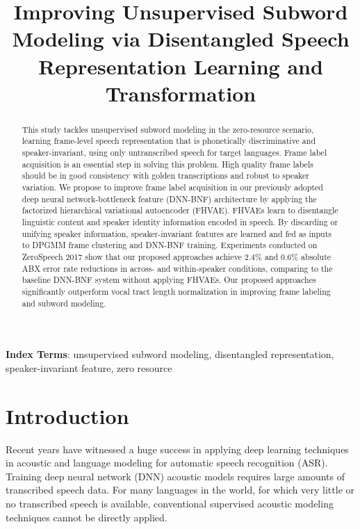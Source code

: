 \documentclass[a4paper]{article}
\title{Improving Unsupervised Subword Modeling via Disentangled Speech Representation Learning and Transformation}
\begin{document}
\maketitle
% 
\begin{abstract}
This study tackles unsupervised subword modeling in the zero-resource scenario, learning frame-level speech representation that is phonetically discriminative and speaker-invariant, using only untranscribed speech for target languages. Frame label acquisition is an essential step in solving this problem. High quality frame labels  should be in good consistency with golden transcriptions and robust to speaker variation. We propose to improve frame label acquisition in our previously adopted deep neural network-bottleneck feature (DNN-BNF) architecture by applying the factorized hierarchical variational autoencoder (FHVAE). FHVAEs learn to disentangle linguistic content and speaker identity information encoded in speech. By discarding or unifying speaker information, speaker-invariant features are learned and fed as inputs to DPGMM frame clustering and DNN-BNF training. Experiments conducted on ZeroSpeech 2017 show that our proposed approaches achieve $2.4\%$ and $0.6\%$ absolute ABX error rate reductions in across- and within-speaker conditions, comparing to the baseline DNN-BNF system without applying FHVAEs. Our proposed approaches significantly outperform vocal tract length normalization in improving frame labeling and subword modeling.

\end{abstract}
\noindent\textbf{Index Terms}: unsupervised subword modeling, disentangled representation, speaker-invariant feature, zero resource

\section{Introduction}
Recent years have witnessed a huge success in applying deep learning  techniques in acoustic and language modeling for automatic speech recognition (ASR). 
Training  deep neural network (DNN) acoustic models  requires large amounts of transcribed speech data. 
For many languages in the world, for which very little or no transcribed speech is available, conventional supervised acoustic modeling techniques cannot be  directly applied.
\end{document}
